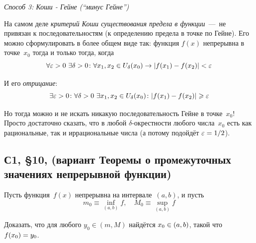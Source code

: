 \documentclass[a4paper,12pt]{article}
\begin{document}
\begin{solution}
    \medskip
    
    \emph{Способ 3: Коши - Гейне (``минус Гейне'')}

    На самом деле \emph{критерий Коши существования предела в функции}~---~не привязан к последовательностям (к определению предела в точке по Гейне).
    Его можно сформулировать в более общем виде так: функция $f(x)$ непрерывна в точке~$x_0$ тогда и только тогда, когда
    \[
      \forall \varepsilon > 0\ \exists \delta > 0\colon \forall x_1, x_2 \in U_{\delta}(x_0) \to |f(x_1) - f(x_2)| < \varepsilon
    \]

    И его \emph{отрицание}:
    \[
      \exists \varepsilon > 0\colon \forall \delta > 0\ \exists x_1, x_2 \in U_{\delta}(x_0)\colon |f(x_1) - f(x_2)| \geqslant \varepsilon
    \]

    Но тогда можно и не искать никакую последовательность Гейне в точке~$x_0$!
    Просто достаточно сказать, что в любой $\delta$-окрестности любого числа~$x_0$ есть как рациональные, так и иррациональные числа (а потому подойдёт $\eps \hm= 1 \hm/ 2$).
  \end{solution}


  \subsection{С1, \S 10,  (вариант Теоремы о промежуточных значениях непрерывной функции)}  %

  Пусть функция~$f(x)$ непрерывна на интервале~$(a, b)$, и пусть
  \[
    m_0 \equiv \inf_{(a, b)} f,\quad M_0 \equiv \sup_{(a, b)} f
  \]

  Доказать, что для любого $y_0 \in (m, M)$ найдётся $x_0 \hm\in (a, b)$, такой что $f(x_0) \hm= y_0$.
  
\end{document}
